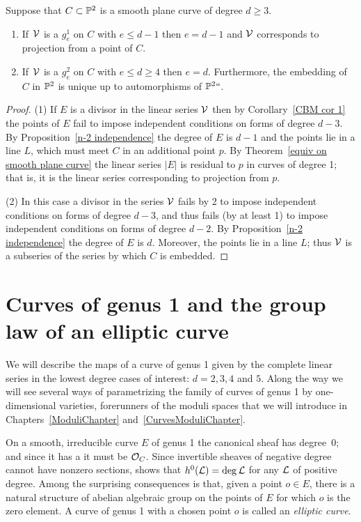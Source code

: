 \begin{corollary}\label{CBM cor 2}
 Suppose that $C\subset \mathbb P^2$ is a smooth plane curve of degree $d\geq 3$.
 
\begin{enumerate}
 \item If $\kern1pt{\mathcal V}$ is a $g^1_e$ on $C$ with $e\leq d-1$ then $e = d-1$ and ${\mathcal V}$
 corresponds to projection from a point of $C$.
 \item If $\kern1pt{\mathcal V}$ is a $g^2_e$ on $C$ with $e\leq d \geq 4$ then $e = d$. Furthermore,  the
  embedding of $C$ in $\mathbb P^2$ is unique up to automorphisms of $\mathbb P^2` `$.
 \end{enumerate}
\end{corollary}

\begin{proof}
(1) If $E$ is a divisor in the linear series ${\mathcal V}$ then by Corollary~\ref{CBM cor 1} the points of $E$ fail to impose
 independent conditions on forms of degree $d-3$. By Proposition~\ref{n-2 independence} the degree of $E$ is $d-1$
 and the points lie in a line $L$, which must meet $C$ in an additional point $p$. By Theorem~\ref{equiv on smooth plane curve}
 the linear series $|E|$ is residual to $p$ in curves of degree 1; that is, it is the linear series corresponding to projection from $p$.
 
(2) In this case a divisor in the series ${\mathcal V}$ fails by 2 to impose independent conditions on forms of degree $d-3$, and
 thus fails (by at least 1) to impose independent conditions on forms of degree $d-2$. By 
  Proposition~\ref{n-2 independence} the degree of $E$ is $d$.
 Moreover, the points lie in a line $L$; thus ${\mathcal V}$ is a subseries of the series by which $C$ is embedded.
 \end{proof}

\section{Curves of genus 1 and the group law of an elliptic curve}

We will describe the maps of a curve of genus 1 given by
the complete linear series in the lowest degree cases of interest: $d =  2, 3, 4$ and $5$. Along the
way we will see several ways of parametrizing the family of curves of genus 1 by one-dimensional varieties,
%
forerunners of the moduli spaces that we will introduce in Chapters~\ref{ModuliChapter} and~\ref{CurvesModuliChapter}.


On a smooth, irreducible curve $E$ of genus 1 the canonical sheaf has degree~0;
and since it has a 
%
it must be ${\mathcal O}_C$.
Since invertible sheaves of negative degree cannot have 
nonzero sections,
%
shows that
$h^0( {\mathcal L}) = \deg {\mathcal L}$ for any ${\mathcal L}$ of positive degree. Among the surprising consequences is that, given
%
a point $o\in E$, there is a natural structure of abelian algebraic group on the points of $E$ for which $o$
is the zero element. A curve of genus 1 with a chosen point $o$ is called an \emph{elliptic curve}.
%

